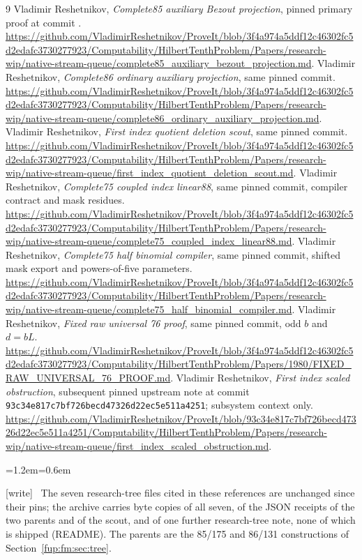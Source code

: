 \documentclass[11pt,letterpaper]{article}
\theoremstyle{definition}\newtheorem{definition}[theorem]{Definition}
\theoremstyle{remark}\newtheorem{remark}[theorem]{Remark}
\newcommand{\code}[1]{\texttt{\detokenize{#1}}}
\newcommand{\wtag}{\textup{[write]}}
\newenvironment{writenote}{\par\smallskip\begin{list}{}{\leftmargin=1.2em\rightmargin=0.6em}\item[]\small\wtag\ }{\end{list}\smallskip}
\begin{document}
\clearpage
\renewcommand{\refname}{References of Report 41}
\begin{thebibliography}{9}
 Vladimir Reshetnikov, \emph{Complete85 auxiliary Bezout projection}, pinned primary proof at commit \code{3f4a974a5ddf12c46302fc5d2edafc3730277923}. \url{https://github.com/VladimirReshetnikov/ProveIt/blob/3f4a974a5ddf12c46302fc5d2edafc3730277923/Computability/HilbertTenthProblem/Papers/research-wip/native-stream-queue/complete85_auxiliary_bezout_projection.md}.
 Vladimir Reshetnikov, \emph{Complete86 ordinary auxiliary projection}, same pinned commit. \url{https://github.com/VladimirReshetnikov/ProveIt/blob/3f4a974a5ddf12c46302fc5d2edafc3730277923/Computability/HilbertTenthProblem/Papers/research-wip/native-stream-queue/complete86_ordinary_auxiliary_projection.md}.
 Vladimir Reshetnikov, \emph{First index quotient deletion scout}, same pinned commit. \url{https://github.com/VladimirReshetnikov/ProveIt/blob/3f4a974a5ddf12c46302fc5d2edafc3730277923/Computability/HilbertTenthProblem/Papers/research-wip/native-stream-queue/first_index_quotient_deletion_scout.md}.
 Vladimir Reshetnikov, \emph{Complete75 coupled index linear88}, same pinned commit, compiler contract and mask residues. \url{https://github.com/VladimirReshetnikov/ProveIt/blob/3f4a974a5ddf12c46302fc5d2edafc3730277923/Computability/HilbertTenthProblem/Papers/research-wip/native-stream-queue/complete75_coupled_index_linear88.md}.
 Vladimir Reshetnikov, \emph{Complete75 half binomial compiler}, same pinned commit, shifted mask export and powers-of-five parameters. \url{https://github.com/VladimirReshetnikov/ProveIt/blob/3f4a974a5ddf12c46302fc5d2edafc3730277923/Computability/HilbertTenthProblem/Papers/research-wip/native-stream-queue/complete75_half_binomial_compiler.md}.
 Vladimir Reshetnikov, \emph{Fixed raw universal 76 proof}, same pinned commit, odd $b$ and $d=bL$. \url{https://github.com/VladimirReshetnikov/ProveIt/blob/3f4a974a5ddf12c46302fc5d2edafc3730277923/Computability/HilbertTenthProblem/Papers/1980/FIXED_RAW_UNIVERSAL_76_PROOF.md}.
 Vladimir Reshetnikov, \emph{First index scaled obstruction}, subsequent pinned upstream note at commit \nolinkurl{93c34e817c7bf726becd47326d22ec5e511a4251}; subsystem context only. \url{https://github.com/VladimirReshetnikov/ProveIt/blob/93c34e817c7bf726becd47326d22ec5e511a4251/Computability/HilbertTenthProblem/Papers/research-wip/native-stream-queue/first_index_scaled_obstruction.md}.
\end{thebibliography}
\begin{writenote}
The seven research-tree files cited in these references are unchanged since their pins; the archive carries byte copies of all seven, of the JSON receipts of the two parents and of the scout, and of one further research-tree note, none of which is shipped (README). The parents are the 85/175 and 86/131 constructions of Section~\ref{fup:fm:sec:tree}.
\end{writenote}
\end{document}
